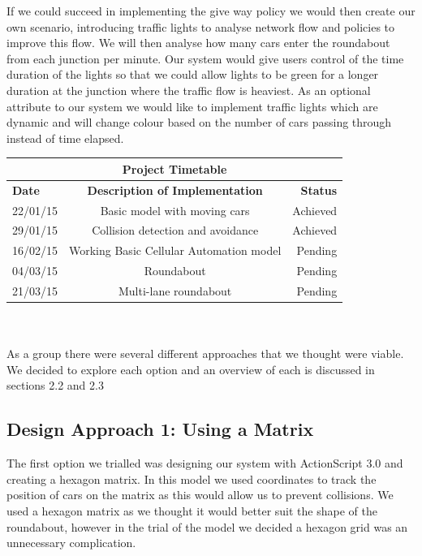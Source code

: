 \documentclass[11pt]{article}
\begin{document}
	
	If we could succeed in implementing the give way policy we would then create our own scenario, introducing traffic lights to analyse network flow and policies to improve this flow. 
	We will then analyse how many cars enter the roundabout from each junction per minute. 
	Our system would give users control of the time duration of the lights so that we could allow lights to be green for a longer duration at the junction where the traffic flow is heaviest. 
	As an optional attribute to our system we would like to implement traffic lights which are dynamic and will change colour based on the number of cars passing through instead of time elapsed. \\
	
	\begin{tabular}{ | l | c | r | }
		\hline
		\multicolumn{3}{|c|}{\textbf{Project Timetable}}  \\ \hline
		\textbf{Date} & \textbf{Description of Implementation} & \textbf{Status} \\ \hline
		22/01/15 & Basic model with moving cars &  Achieved \\ \hline
		29/01/15 & Collision detection and avoidance & Achieved \\ \hline
		16/02/15 & Working Basic Cellular Automation model & Pending \\ \hline
		04/03/15 & Roundabout & Pending \\ \hline
		21/03/15 & Multi-lane roundabout & Pending \\ \hline
		
	\end{tabular}\\\\
	
		\noindent As a group there were several different approaches that we thought were viable.
		 We decided to explore each option and an overview of each is discussed in sections 2.2 and 2.3
		\
	\subsection{Design Approach 1: Using a Matrix}

	
	The first option we trialled was designing our system with ActionScript 3.0 and creating a hexagon matrix. 
	In this model we used coordinates to track the position of cars on the matrix as this would allow us to prevent collisions. 
	We used a hexagon matrix as we thought it would better suit the shape of the roundabout, however in the trial of the model we decided a hexagon grid was an unnecessary complication. 
	
\end{document}
